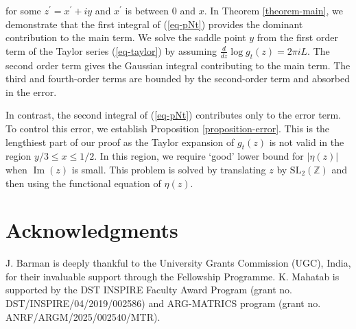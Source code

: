 \documentclass[11pt]{amsart}
\theoremstyle{plain}
\renewcommand{\Im}{\operatorname{Im}}
\numberwithin{equation}{section}
\begin{document}
	for some $z^{\prime}=x^{\prime}+iy$ and $x^{\prime}$ is between $0$ and $x$.
	In Theorem \ref{theorem-main}, we demonstrate that the first integral of (\ref{eq-pNt}) provides the dominant contribution to the main term.  We solve the saddle point $y$ from the first order term of the Taylor series (\ref{eq-taylor}) by assuming $\frac{d}{dz}\log g_t(z)=2\pi iL$. The second order term gives the Gaussian integral contributing to the main term. The third and fourth-order terms are bounded by the second-order term and absorbed in the error.  
	
	In contrast, the second integral of (\ref{eq-pNt}) contributes only to the error term.	To control this error, we establish Proposition \ref{proposition-error}. This is the lengthiest part of our proof as the Taylor expansion of $g_t(z)$ is not valid in the region $y/3\leq x\leq 1/2$. In this region, we require `good' lower bound for $|\eta(z)|$ when $\Im(z)$ is small. This problem is solved by translating $z$ by $\text{SL}_{2}(\mathbb{Z})$ and then using the functional equation of $\eta(z)$.
	
	\section{Acknowledgments}
	J. Barman is deeply thankful to the University Grants Commission (UGC), India, for their invaluable support through the Fellowship Programme. K. Mahatab is supported by the DST INSPIRE Faculty Award Program (grant no. DST/INSPIRE/04/2019/002586) and ARG-MATRICS program (grant no. ANRF/ARGM/2025/002540/MTR).
	
\end{document}

